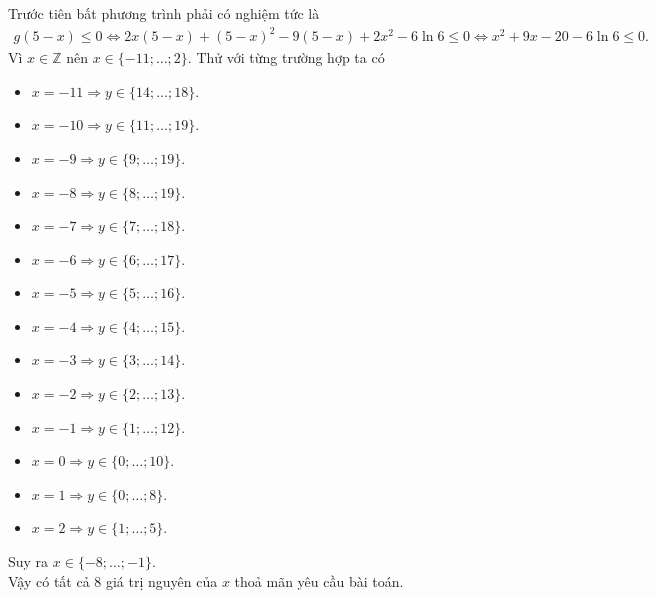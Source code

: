 \begin{ex}
{\begin{center}
\end{center}
Trước tiên bất phương trình phải có nghiệm tức là
\begin{align*}
g(5-x)\leq 0\Leftrightarrow 2x(5-x)+(5-x)^2-9(5-x)+2x^2-6\ln 6\leq 0\Leftrightarrow x^2+9x-20-6\ln 6\leq 0.
\end{align*}
Vì $x\in \mathbb{Z}$ nên $x\in \{-11;\ldots;2\}$. Thử với từng trường hợp ta có
\begin{multicols}{2}
\begin{itemize}
\item $x=-11\Rightarrow y\in \{14;\ldots;18\}$.
\item $x=-10\Rightarrow y\in \{11;\ldots;19\}$.
\item $x=-9\Rightarrow y\in \{9;\ldots;19\}$.
\item $x=-8\Rightarrow y\in \{8;\ldots;19\}$.
\item $x=-7\Rightarrow y\in \{7;\ldots;18\}$.
\item $x=-6\Rightarrow y\in \{6;\ldots;17\}$.
\item $x=-5\Rightarrow y\in \{5;\ldots;16\}$.
\item $x=-4\Rightarrow y\in \{4;\ldots;15\}$.
\item $x=-3\Rightarrow y\in \{3;\ldots;14\}$.
\item $x=-2\Rightarrow y\in \{2;\ldots;13\}$.
\item $x=-1\Rightarrow y\in \{1;\ldots;12\}$.
\item $x=0\Rightarrow y\in \{0;\ldots;10\}$.
\item $x=1\Rightarrow y\in \{0;\ldots;8\}$.
\item $x=2\Rightarrow y\in \{1;\ldots;5\}$.
\end{itemize}
\end{multicols}
Suy ra $x\in \{-8;\ldots;-1\}$.\\ 
Vậy có tất cả $8$ giá trị nguyên của $x$ thoả mãn yêu cầu bài toán.
}
\end{ex}


